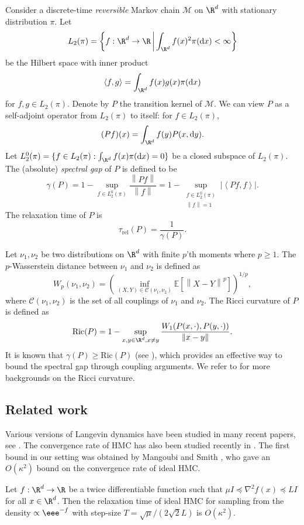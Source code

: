 \documentclass{toc}
\newcommand{\dif}{\mathrm{d}}
\newcommand{\Exp}{\mathbb{E}}
\newcommand{\norm}[1]{\left\lVert #1 \right\rVert}
\newcommand{\ip}[2]{\left\langle #1 , #2 \right\rangle}
\newcommand{\grad}{\nabla}
\newcommand{\Trel}{\tau_{\mathrm{rel}}}
\begin{document}
%
%
%
Consider a discrete-time \emph{reversible} Markov chain $\mathcal{M}$ on $\R^d$ with stationary distribution $\pi$. 
Let
\[
L_2(\pi) = \left\{ f: \R^d \to \R \,\middle|\, \int_{\R^d} f(x)^2 \pi(\dif x) < \infty \right\}
\]
be the Hilbert space with inner product
\[
\ip{f}{g} = \int_{\R^d} f(x) g(x) \pi(\dif x)
\]
for $f,g \in L_2(\pi)$. 
Denote by $P$ the transition kernel of $\mathcal{M}$. 
We can view $P$ as a self-adjoint operator from $L_2(\pi)$ to itself: for $f\in L_2(\pi)$, 
\[
(Pf) (x) = \int_{\R^d} f(y)P(x,\dif y).
\]
%
Let $L_2^0(\pi) = \{ f\in L_2(\pi): \int_{\R^d} f(x) \pi(\dif x) = 0 \}$ be a closed subspace of $L_2(\pi)$. The (absolute) \emph{spectral gap} of $P$ is defined to be
\[
\gamma(P) = 1 - \sup_{f\in L_2^0(\pi)}\frac{\norm{Pf}}{\norm{f}} = 1 - \sup_{\substack{f\in L_2^0(\pi)\\ \norm{f} = 1}} |\ip{Pf}{f}|.
\]
The relaxation time of $P$ is 
\[
\Trel(P) = \frac{1}{\gamma(P)}.
\]

Let $\nu_1,\nu_2$ be two distributions on $\R^d$ with finite $p$'th moments where $p \ge 1$. 
The $p$-Wasserstein distance between $\nu_1$ and $\nu_2$ is defined as
\[
W_p(\nu_1,\nu_2) = \left( \inf_{(X,Y) \in \mathcal{C}(\nu_1,\nu_2)} \Exp\left[ \norm{X-Y}^p \right] \right)^{1/p},
\]
where $\mathcal{C}(\nu_1,\nu_2)$ is the set of all couplings of $\nu_1$ and $\nu_2$. 
The Ricci curvature of $P$ is defined as
\[
\mathrm{Ric}(P) = 1 - \sup_{x,y \in \R^d, x \neq y} \frac{W_1(P(x, \cdot), P(y, \cdot))}{\norm{x-y}}. 
\]
It is known that $\gamma(P) \ge \mathrm{Ric}(P)$ (see \cite[Proposition 29]{O09}), which provides an effective way to bound the spectral gap through coupling arguments. 
We refer to \cite{O09} for more backgrounds on the Ricci curvature. 
	
	

\subsection{Related work}
Various versions of Langevin dynamics have been studied in many recent papers, see \cite{D17,DK19, ZLC17,RRT17, DRD18,CCBJ, CCABJ18,CFMBJ18, DCWY18,W18, VW19,MCCFBJ19}. 
The convergence rate of HMC %
has also been   %
studied recently in \cite{LSV18,LV18,MS17, MS19,MV18,SRH14}. 
%
The first bound %
in  %
our setting was obtained by Mangoubi and Smith \cite{MS17}, who gave an $O(\kappa^2)$ bound on the convergence rate of ideal HMC. 

\begin{theorem}[{\cite[Theorem 1]{MS17}}]
	Let $f:\R^d \to\R$ be a twice differentiable function such that $\mu I \preceq \grad^2 f(x) \preceq L I$ for all $x\in\R^d$. 
	Then the relaxation time of ideal HMC for sampling from the density $\propto \eee^{-f}$ with step-size $T = \sqrt{\mu}/(2\sqrt{2} L)$ is $O(\kappa^{2})$.  
\end{theorem}
\end{document}
